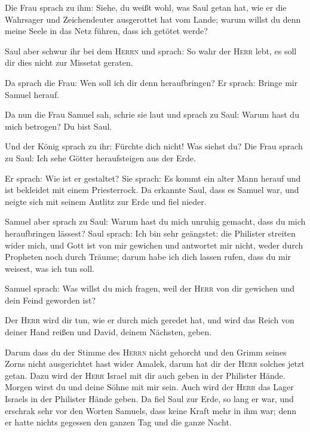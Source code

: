  Die Frau sprach zu ihm: Siehe, du weißt wohl, was Saul
getan hat, wie er die Wahrsager und Zeichendeuter ausgerottet hat vom
Lande; warum willst du denn meine Seele in das Netz führen, dass ich
getötet werde?

 Saul aber schwur ihr bei dem \textsc{Herrn} und sprach:
So wahr der \textsc{Herr} lebt, es soll dir dies nicht zur Missetat
geraten.

 Da sprach die Frau: Wen soll ich dir denn heraufbringen?
Er sprach: Bringe mir Samuel herauf.

 Da nun die Frau Samuel sah, schrie sie laut und sprach
zu Saul: Warum hast du mich betrogen? Du bist Saul.

 Und der König sprach zu ihr: Fürchte dich nicht! Was
siehst du? Die Frau sprach zu Saul: Ich sehe Götter heraufsteigen aus
der Erde.

 Er sprach: Wie ist er gestaltet? Sie sprach: Es kommt
ein alter Mann herauf und ist bekleidet mit einem Priesterrock. Da
erkannte Saul, dass es Samuel war, und neigte sich mit seinem Antlitz
zur Erde und fiel nieder.

 Samuel aber sprach zu Saul: Warum hast du mich unruhig
gemacht, dass du mich heraufbringen lässest? Saul sprach: Ich bin sehr
geängstet: die Philister streiten wider mich, und Gott ist von mir
gewichen und antwortet mir nicht, weder durch Propheten noch durch
Träume; darum habe ich dich lassen rufen, dass du mir weisest, was ich
tun soll.

 Samuel sprach: Was willst du mich fragen, weil der
\textsc{Herr} von dir gewichen und dein Feind geworden ist?

 Der \textsc{Herr} wird dir tun, wie er durch mich
geredet hat, und wird das Reich von deiner Hand reißen und David, deinem
Nächsten, geben.

 Darum dass du der Stimme des \textsc{Herrn} nicht
gehorcht und den Grimm seines Zorns nicht ausgerichtet hast wider
Amalek, darum hat dir der \textsc{Herr} solches jetzt getan.
 Dazu wird der \textsc{Herr} Israel mit dir auch geben in
der Philister Hände. Morgen wirst du und deine Söhne mit mir sein. Auch
wird der \textsc{Herr} das Lager Israels in der Philister Hände geben.
 Da fiel Saul zur Erde, so lang er war, und erschrak sehr
vor den Worten Samuels, dass keine Kraft mehr in ihm war; denn er hatte
nichts gegessen den ganzen Tag und die ganze Nacht.


